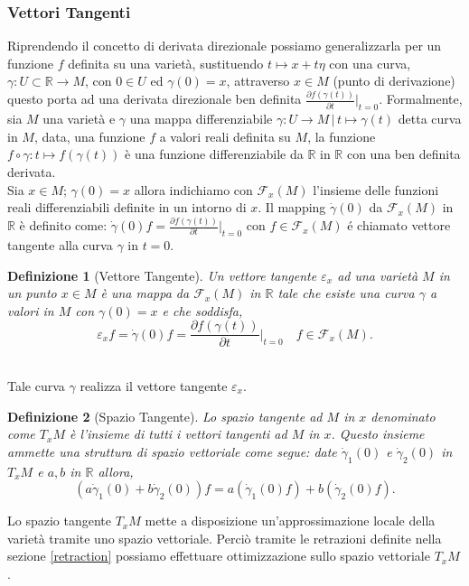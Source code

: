 \documentclass[a4paper, 12pt]{article}
\newtheorem{definition}{Definizione}
\begin{document}
\subsubsection{Vettori Tangenti}
Riprendendo il concetto di derivata direzionale possiamo generalizzarla per un funzione $f$ definita su una varietà, sustituendo $t \mapsto x + t\eta$ con una curva, $\gamma: U \subset \mathbb{R} \to M$, con $0 \in U$ ed $\gamma (0) = x$, attraverso $x \in M$ (punto di derivazione) questo porta ad una derivata direzionale ben definita $\frac{\partial f(\gamma (t))}{\partial t} \vert_{t=0}$. Formalmente, sia $M$ una varietà e $\gamma$ una mappa differenziabile $\gamma : U \to M \, | \, t \mapsto \gamma (t)$ detta curva in $M$, data, una funzione $f$ a valori reali definita su $M$, la funzione $f \circ \gamma : t \mapsto f(\gamma (t))$ è una funzione differenziabile da $\mathbb{R}$ in $\mathbb{R}$ con una ben definita derivata.\\
Sia $x \in M$; $\gamma (0) = x$ allora indichiamo con $\mathcal{F}_{x}(M)$ l'insieme delle funzioni reali differenziabili definite in un intorno di $x$. Il mapping $\dot{\gamma} (0)$ da $\mathcal{F}_x(M)$ in $\mathbb{R}$ è definito come: $\dot{\gamma} (0) f = \frac{\partial f(\gamma (t))}{\partial t} \vert_{t=0}$ con $f \in \mathcal{F}_x(M)$ é chiamato vettore tangente alla curva $\gamma$ in $t=0$.
\begin{definition}[Vettore Tangente]
Un vettore tangente $\varepsilon_x$ ad una varietà $M$ in un punto $x \in M$ è una mappa da $\mathcal{F}_x(M)$ in $\mathbb{R}$ tale che esiste una curva $\gamma$ a valori in $M$ con $\gamma (0) = x$ e che soddisfa,\\
\[\varepsilon_xf = \dot{\gamma} (0) f = \frac{\partial f(\gamma (t))}{\partial t} \vert_{t=0} \quad  f \in \mathcal{F}_x(M).\]\\
\end{definition}
Tale curva $\gamma$ realizza il vettore tangente $\varepsilon_x$.
\begin{definition}[Spazio Tangente]
Lo spazio tangente ad $M$ in $x$ denominato come $T_xM$ è l'insieme di tutti i vettori tangenti ad $M$ in $x$. Questo insieme ammette una struttura di spazio vettoriale come segue: date $\dot{\gamma}_1 (0)$ e $\dot{\gamma}_2 (0)$ in $T_xM$ e $a, b$ in $\mathbb{R}$ allora,\\
\[(a \dot{\gamma}_1 (0) + b \dot{\gamma}_2 (0)) f = a (\dot{\gamma}_1 (0) f) + b (\dot{\gamma}_2 (0) f).\]
\end{definition}
Lo spazio tangente $T_xM$ mette a disposizione un'approssimazione locale della varietà tramite uno spazio vettoriale. Perciò tramite le retrazioni definite nella sezione \ref{retraction} possiamo effettuare ottimizzazione sullo spazio vettoriale $T_xM$.
\end{document}
